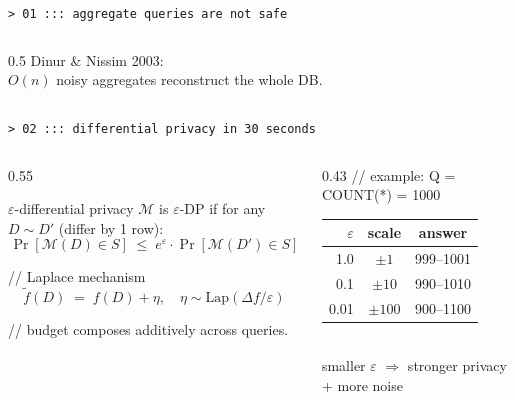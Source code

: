 \documentclass[aspectratio=169,10pt]{beamer}
\newcommand{\eps}{\varepsilon}
\begin{document}
\begin{frame}[fragile]{\texttt{> 01 ::: aggregate queries are not safe}}
\begin{columns}[T,onlytextwidth]
\begin{column}{0.5\textwidth}
\vspace{0.8em}
{\color{cyan}\ttfamily\small Dinur \& Nissim 2003:}\\
{\color{dim}\small $O(n)$ noisy aggregates reconstruct the whole DB.}
\end{column}
\end{columns}

\end{frame}

\begin{frame}{\texttt{> 02 ::: differential privacy in 30 seconds}}

\begin{columns}[T,onlytextwidth]
\begin{column}{0.55\textwidth}

\begin{block}{\ttfamily\small $\eps$-differential privacy}
$\mathcal{M}$ is $\eps$-DP if for any $D \sim D'$ (differ by 1 row):
\[
\Pr[\mathcal{M}(D) \in S] \;\leq\; e^{\eps} \cdot \Pr[\mathcal{M}(D') \in S]
\]
\end{block}

{\color{dim}\ttfamily\scriptsize // Laplace mechanism}
\[
\widetilde{f}(D) \;=\; f(D) + \eta, \quad \eta \sim \text{Lap}(\Delta f / \eps)
\]

{\color{dim}\ttfamily\scriptsize // budget composes additively across queries.}

\end{column}

\begin{column}{0.43\textwidth}
\centering
{\color{dim}\ttfamily\scriptsize // example: Q = COUNT(*) = 1000}\\[0.3em]
\begin{tabular}{r|c|c}
\toprule
{\color{cyan}\small$\eps$} & {\color{cyan}\small scale} & {\color{cyan}\small answer} \\
\midrule
{\color{neon}\small 1.0}  & \small$\pm 1$    & \small 999--1001 \\
{\color{yellow}\small 0.1}  & \small$\pm 10$   & \small 990--1010 \\
{\color{magenta}\small 0.01} & \small$\pm 100$  & \small 900--1100 \\
\bottomrule
\end{tabular}\\[0.4em]
{\color{dim}\ttfamily\scriptsize smaller $\eps$ $\Rightarrow$ stronger privacy + more noise}

\end{column}
\end{columns}


\end{frame}
\end{document}
